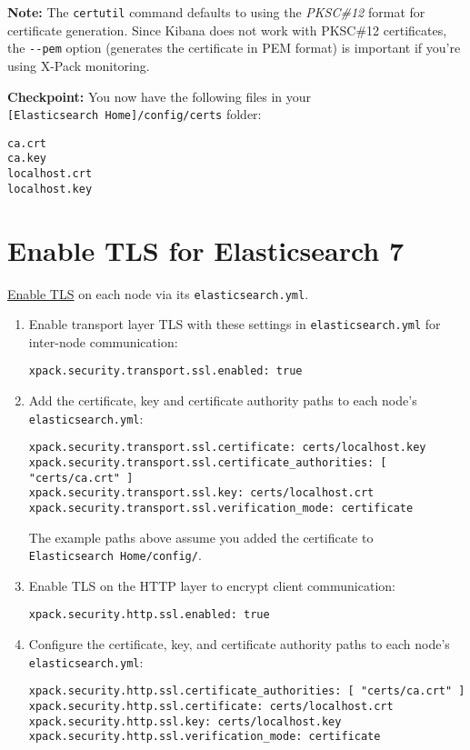 \noindent\hrulefill

\textbf{Note:} The \texttt{certutil} command defaults to using the
\emph{PKSC\#12} format for certificate generation. Since Kibana does not
work with PKSC\#12 certificates, the \texttt{-\/-pem} option (generates
the certificate in PEM format) is important if you're using X-Pack
monitoring.

\noindent\hrulefill

\textbf{Checkpoint:} You now have the following files in your
\texttt{{[}Elasticsearch\ Home{]}/config/certs} folder:

\begin{verbatim}
ca.crt
ca.key
localhost.crt
localhost.key
\end{verbatim}

\section{Enable TLS for Elasticsearch
7}\label{enable-tls-for-elasticsearch-7}

\href{https://www.elastic.co/guide/en/elasticsearch/reference/7.x/configuring-tls.html\#enable-ssl}{Enable
TLS} on each node via its \texttt{elasticsearch.yml}.

\begin{enumerate}
\def\labelenumi{\arabic{enumi}.}
\item
  Enable transport layer TLS with these settings in
  \texttt{elasticsearch.yml} for inter-node communication:

\begin{verbatim}
xpack.security.transport.ssl.enabled: true
\end{verbatim}
\item
  Add the certificate, key and certificate authority paths to each
  node's \texttt{elasticsearch.yml}:

\begin{verbatim}
xpack.security.transport.ssl.certificate: certs/localhost.key
xpack.security.transport.ssl.certificate_authorities: [ "certs/ca.crt" ]
xpack.security.transport.ssl.key: certs/localhost.crt
xpack.security.transport.ssl.verification_mode: certificate
\end{verbatim}

  The example paths above assume you added the certificate to
  \texttt{Elasticsearch\ Home/config/}.
\item
  Enable TLS on the HTTP layer to encrypt client communication:

\begin{verbatim}
xpack.security.http.ssl.enabled: true
\end{verbatim}
\item
  Configure the certificate, key, and certificate authority paths to
  each node's \texttt{elasticsearch.yml}:

\begin{verbatim}
xpack.security.http.ssl.certificate_authorities: [ "certs/ca.crt" ]
xpack.security.http.ssl.certificate: certs/localhost.crt
xpack.security.http.ssl.key: certs/localhost.key
xpack.security.http.ssl.verification_mode: certificate
\end{verbatim}
\end{enumerate}

